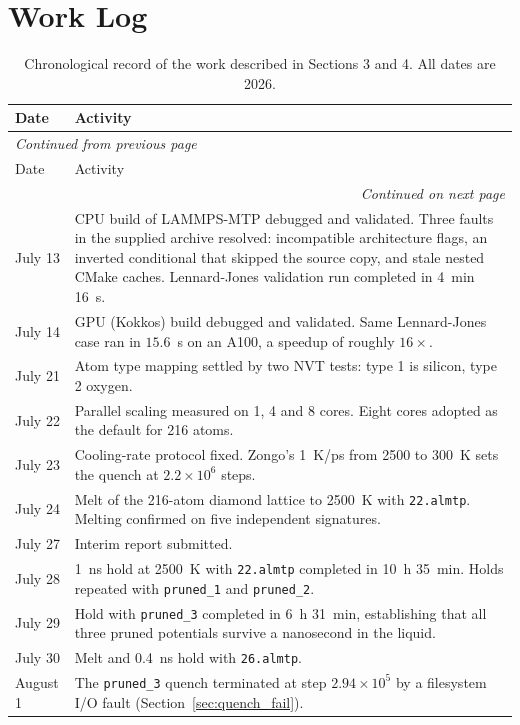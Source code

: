 \documentclass{article}
\begin{document}
\section{Work Log}
\label{sec:worklog}

\begin{longtable}{l|p{}}
\toprule
Date & Activity \\
\midrule
\endfirsthead
\multicolumn{2}{l}{\small\itshape Continued from previous page} \\
\toprule
Date & Activity \\
\midrule
\endhead
\midrule
\multicolumn{2}{r}{\small\itshape Continued on next page} \\
\endfoot
\bottomrule
\caption{Chronological record of the work described in Sections 3 and 4. All dates are 2026.}
\label{tab:worklog}
\endlastfoot
July 13 & CPU build of LAMMPS-MTP debugged and validated. Three faults in the supplied archive resolved: incompatible architecture flags, an inverted conditional that skipped the source copy, and stale nested CMake caches. Lennard-Jones validation run completed in 4~min 16~s. \\
July 14 & GPU (Kokkos) build debugged and validated. Same Lennard-Jones case ran in $15.6$~s on an A100, a speedup of roughly $16\times$. \\
July 21 & Atom type mapping settled by two NVT tests: type 1 is silicon, type 2 oxygen. \\
July 22 & Parallel scaling measured on 1, 4 and 8 cores. Eight cores adopted as the default for 216 atoms. \\
July 23 & Cooling-rate protocol fixed. Zongo's 1~K/ps from 2500 to 300~K sets the quench at $2.2\times10^{6}$ steps. \\
July 24 & Melt of the 216-atom diamond lattice to 2500~K with \texttt{22.almtp}. Melting confirmed on five independent signatures. \\
July 27 & Interim report submitted. \\
July 28 & 1~ns hold at 2500~K with \texttt{22.almtp} completed in 10~h 35~min. Holds repeated with \texttt{pruned\_1} and \texttt{pruned\_2}. \\
July 29 & Hold with \texttt{pruned\_3} completed in 6~h 31~min, establishing that all three pruned potentials survive a nanosecond in the liquid. \\
July 30 & Melt and 0.4~ns hold with \texttt{26.almtp}. \\
August 1 & The \texttt{pruned\_3} quench terminated at step $2.94\times10^{5}$ by a filesystem I/O fault (Section~\ref{sec:quench_fail}). \\

\end{longtable}
\end{document}
